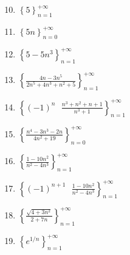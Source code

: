 \documentclass[12pt]{article}
\newif\ifans
\begin{document}
\begin{enumerate}
\setcounter{enumi}{9}
  
\item $\left\{ 5 \right\}_{n = 1}^{+\infty}$

\ifans{\fbox{Converges to $5$.}} \fi

\item $\left\{ 5n \right\}_{n = 0}^{+\infty}$

\ifans{\fbox{Diverges to $+\infty$.}} \fi

\item $\left\{ 5-5n^3 \right\}_{n = 1}^{+\infty}$

\ifans{\fbox{Diverges to $-\infty$.}} \fi

\item $\left\{ \frac{4n-3n^5}{2n^5+4n^3+n^2+5} \right\}_{n = 1}^{+\infty}$

\ifans{\fbox{Converges to $-\frac{3}{2}$.  See \underline{Limits at Infinity Review} problem \#2.}} \fi

\item $\left\{ (-1)^n \text{ } \frac{n^3+n^2+n+1}{n^3+1} \right\}_{n = 1}^{+\infty}$

\ifans{\fbox{\parbox{1\linewidth}{The odd-numbered terms converge to $-1$, but the even-numbered terms converge to $1$, so the sequence diverges.}}} \fi

\item $\left\{ \frac{n^4-3n^3-2n}{4n^2+19} \right\}_{n = 0}^{+\infty}$

\ifans{\fbox{Diverges to $+\infty$.}} \fi

\item $\left\{ \frac{1-10n^2}{n^2-4n^3} \right\}_{n = 1}^{+\infty}$

\ifans{\fbox{Converges to $0$.}} \fi

\item $\left\{ (-1)^{n+1} \text{ } \frac{1-10n^2}{n^2-4n^3} \right\}_{n = 1}^{+\infty}$

\ifans{\fbox{Converges to $0$.}} \fi

\item $\left\{ \frac{\sqrt{4+3n^2}}{2+7n} \right\}_{n = 1}^{+\infty}$

\ifans{\fbox{Converges to $\frac{\sqrt{3}}{7}$.  See \underline{Limits at Infinity Review} problem \#3.}} \fi

\item $\left\{ e^{1/n} \right\}_{n = 1}^{+\infty}$

\ifans{\fbox{Converges to $1$.}} \fi


\end{enumerate}
\end{document}
